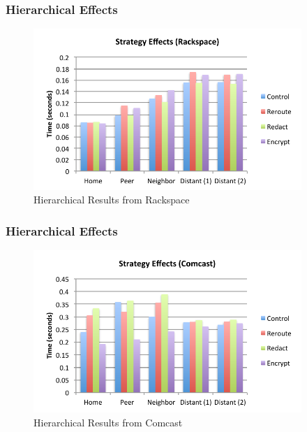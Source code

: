 \documentclass[t,handout]{beamer}
\begin{document}
\begin{frame}
\frametitle{Hierarchical Effects}
\begin{figure}[!t]
\centering
\includegraphics[width=4in]{strategy_effects_rs}
\caption{Hierarchical Results from Rackspace}
\end{figure}
\end{frame}

\begin{frame}
\frametitle{Hierarchical Effects}
\begin{figure}[!t]
\centering
\includegraphics[width=4in]{strategy_effects_local}
\caption{Hierarchical Results from Comcast}
\end{figure}
\end{frame}
\end{document}
